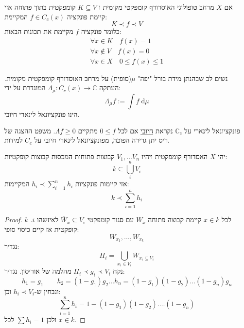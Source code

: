 \documentclass{tstextbook}
\begin{document}
\begin{theorem}
אם \(X\) מרחב טופולוגי האוסדורף קומפקטי מקומית ו-\(K\subseteq V\) קומפקטית בתוך פתוחה אזי קיימת פונקציה \(f\in C_{c}(x)\) המקיימת:
$$K \prec f \prec V$$
כלומר פונקציה \(f\) מקיימת את תכונות הבאות:
$$\begin{gather}\forall x \in K \quad f(x)=1\\ \forall x \not  \in V \quad  f(x) = 0 \\ \forall x \in X \quad 0\leq f(x)\leq 1 
\end{gather}$$

\end{theorem}
\begin{remark}
נשים לב שבהנתן מידת בורל "יפה" \(\mu\)(סופית) על מרחב האוסדורף קומפקטית מקומית. העתקה \(\Lambda_{\mu}:C_{c}(x)\to \mathbb{C}\) המוגדרת על ידי:
$$\Lambda_{\mu}f := \int f \;\mathrm{d} \mu $$
הינו פונקציונאל לינארי חיובי.

\end{remark}
\begin{definition}
פונקציונאל לינארי על \(\mathbb{C}_{c}\) נקראת \underline{חיובי} אם לכל \(0\leq f\) מתקיים \(\Lambda f \geq 0\). משפט ההצגה של ריס יתן גרירה הפוכה, מפונקציונאל לינארי חיובי על \(C_{c}\) למידות.

\end{definition}
\begin{lemma}
יהי \(X\) האסדורף קומפקטית ויהיו \(V_{1},\dots V_{n}\) קבוצות פתוחות המכסות קבוצות קופקטיות:
$$k\subseteq \bigcup_{i}^{n} V_{i}$$
אזי קיימות פונקציות \(h_{i}\prec \sum_{i=1}^{n}h_{i}\) המקיימות:
$$k\prec \sum_{i=1}^{n} h_{i}$$

\end{lemma}
\begin{proof}
לכל \(x \in k\) קיימת קבוצה פתוחה \(W_{x}\) עם סגור קומפקטי \(\overline{W}_{x}\subseteq V_{i}\) לאיזשהו \(i\). \(k\) קופקטית אז קיים כיסוי סופי:
$$W_{x_{1}},\dots,W_{x_{k}}$$
נגדיר:
$$H_{i}=\bigcup_{x_{i}\in V_{i}}\overline{W} _{x_{i}\subseteq V_{i}}$$
נקח \(H_{i}\prec g_{i}\prec V_{i}\) מהלמה של אוריסון. נגדיר:
$$h_{1}=g_{1}\qquad h_{2}=(1-g_{1})g_{2}\dots h_{n}=(1-g_{1})(1-g_{2})\dots(1-g_{n})g_{n}$$
ונבחין ש-\(h_{i}\prec V_{i}\) וכן:
$$\sum_{i=1}^{n} h_{i}= 1-(1-g_{1})(1-g_{2})\dots.(1-g_{n})$$
ולכן \(\sum h_{i}=1\) לכל \(x \in k\).

\end{proof}
\end{document}
